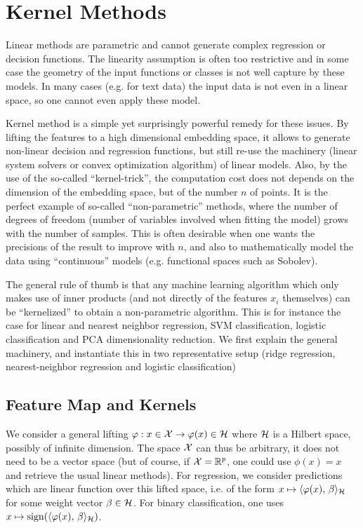 \section{Kernel Methods}
\label{sec-kernel-methods}

Linear methods are parametric and cannot generate complex regression or decision functions. The linearity assumption is often too restrictive and in some case the geometry of the input functions or classes is not well capture by these models.  In many cases (e.g. for text data) the input data is not even in a linear space, so one cannot even apply these model.

Kernel method is a simple yet surprisingly powerful remedy for these issues. By lifting the features to a high dimensional embedding space, it allows to generate non-linear decision and regression functions, but still re-use the machinery (linear system solvers or convex  optimization algorithm) of linear models. Also, by the use of the so-called ``kernel-trick'', the computation cost does not depends on the dimension of the embedding space, but of the number $n$ of points. It is the perfect example of so-called ``non-parametric'' methods, where the number of degrees of freedom (number of variables involved when fitting the model) grows with the number of samples. This is often desirable when one wants the precisions of the result to improve with $n$, and also to mathematically model the data using ``continuous''  models (e.g. functional spaces such as Sobolev).

The general rule of thumb is that any machine learning algorithm which only makes use of inner products (and not directly of the features $x_i$ themselves) can be ``kernelized'' to obtain a non-parametric algorithm. This is for instance the case for linear and nearest neighbor regression, SVM classification, logistic classification and PCA dimensionality reduction. We first explain the general machinery, and instantiate this in two representative setup (ridge regression, nearest-neighbor regression and logistic classification)

\subsection{Feature Map and Kernels}

We consider a general lifting $\varphi : x \in \mathcal{X} \rightarrow \varphi(x) \in \mathcal{H}$ where $\mathcal{H}$ is a Hilbert space, possibly of infinite dimension. 
%
The space $\mathcal{X}$ can thus be arbitrary, it does not need to be a vector space (but of course, if $\mathcal{X}=\mathbb{R}^p$, one could use $\phi(x)=x$ and retrieve the usual linear methods).
%
For regression, we consider predictions which are linear function over this lifted space, i.e. of the form $x \mapsto \langle \varphi(x),\,\beta\rangle_{\mathcal{H}}$ for some weight vector $\beta \in \mathcal{H}$. For binary classification, one uses $x \mapsto \operatorname{sign}(\langle \varphi(x),\,\beta\rangle_{\mathcal{H}})$.


